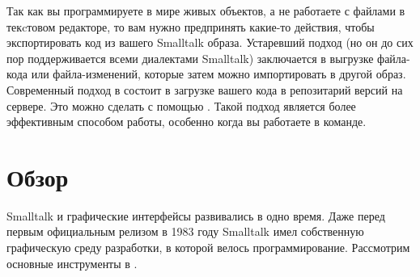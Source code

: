 \documentclass[a4paper,10pt,twoside]{book}
\begin{document}

Так как вы программируете в мире живых объектов, а не работаете с файлами в текcтовом редакторе, то вам нужно предпринять какие-то действия, чтобы экспортировать код из вашего Smalltalk образа.
Устаревший подход (но он до сих пор поддерживается всеми диалектами Smalltalk) заключается в выгрузке файла-кода или файла-изменений, которые затем можно импортировать в другой образ.
Современный подход в \pharo состоит в загрузке вашего кода в репозитарий версий на сервере. Это можно сделать с помощью . Такой подход является более эффективным способом работы, особенно когда вы работаете в команде.


\section{Обзор}


Smalltalk и графические интерфейсы развивались в одно время.
Даже перед первым официальным релизом в 1983 году Smalltalk имел собственную графическую среду разработки, в которой велось программирование.
Рассмотрим основные инструменты в \pharo.
\end{document}
